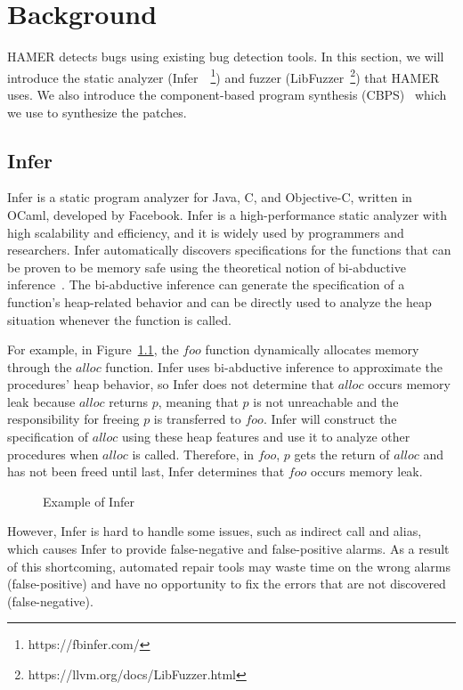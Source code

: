 \documentclass[a4paper,11pt,oneside,openany]{book}
\begin{document}

\chapter{Background}

HAMER detects bugs using existing bug detection tools. In this section, we will introduce the static analyzer (Infer~\cite{infer}~\footnote{https://fbinfer.com/}) and fuzzer (LibFuzzer~\footnote{https://llvm.org/docs/LibFuzzer.html}) that HAMER uses. We also introduce the component-based program synthesis (CBPS)~\cite{oracle} which we use to synthesize the patches. 

\section{Infer}

Infer is a static program analyzer for Java, C, and Objective-C, written in OCaml, developed by Facebook. Infer is a high-performance static analyzer with high scalability and efficiency, and it is widely used by programmers and researchers. Infer automatically discovers specifications for the functions that can be proven to be memory safe using the theoretical notion of bi-abductive inference~\cite{bi}. The bi-abductive inference can generate the specification of a function's heap-related behavior and can be directly used to analyze the heap situation whenever the function is called.

For example, in Figure~\ref{inferexample}, the $foo$ function dynamically allocates memory through the $alloc$ function. Infer uses bi-abductive inference to approximate the procedures' heap behavior, so Infer does not determine that $alloc$ occurs memory leak because $alloc$ returns $p$, meaning that $p$ is not unreachable and the responsibility for freeing $p$ is transferred to $foo$. Infer will construct the specification of $alloc$ using these heap features and use it to analyze other procedures when $alloc$ is called. Therefore, in $foo$, $p$ gets the return of $alloc$ and has not been freed until last, Infer determines that $foo$ occurs memory leak.

\begin{figure}[h]
    
    \caption{Example of Infer}
    \label{inferexample}
\end{figure}

However, Infer is hard to handle some issues, such as indirect call and alias, which causes Infer to provide false-negative and false-positive alarms. As a result of this shortcoming, automated repair tools may waste time on the wrong alarms (false-positive) and have no opportunity to fix the errors that are not discovered (false-negative).
\end{document}
